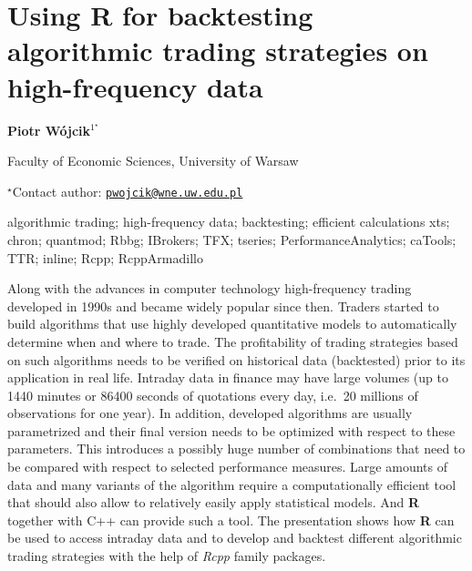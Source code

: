 \documentclass[\main/boa.tex]{subfiles}
\begin{document}
\pagestyle{empty}

\section{Using R for backtesting algorithmic trading strategies on high-frequency
data}

\begin{center}
  {\bf Piotr Wójcik$^{1^\star}$}
\end{center}

\vskip 0.3cm

\begin{affiliations}
\begin{enumerate}
\begin{minipage}{0.915\textwidth}
\centering
\item Faculty of Economic Sciences, University of Warsaw \\[-2pt]
\end{minipage}
\end{enumerate}
$^\star$Contact author: \href{mailto:pwojcik@wne.uw.edu.pl}{\nolinkurl{pwojcik@wne.uw.edu.pl}}\\
\end{affiliations}

\vskip 0.5cm

\begin{minipage}{0.915\textwidth}
\keywords algorithmic trading; high-frequency data; backtesting; efficient
calculations
\packages xts; chron; quantmod; Rbbg; IBrokers; TFX; tseries;
PerformanceAnalytics; caTools; TTR; inline; Rcpp; RcppArmadillo
\end{minipage}

\vskip 0.8cm

Along with the advances in computer technology high-frequency trading
developed in 1990s and became widely popular since then. Traders started
to build algorithms that use highly developed quantitative models to
automatically determine when and where to trade. The profitability of
trading strategies based on such algorithms needs to be verified on
historical data (backtested) prior to its application in real life.
Intraday data in finance may have large volumes (up to 1440 minutes or
86400 seconds of quotations every day, i.e.~20 millions of observations
for one year). In addition, developed algorithms are usually
parametrized and their final version needs to be optimized with respect
to these parameters. This introduces a possibly huge number of
combinations that need to be compared with respect to selected
performance measures. Large amounts of data and many variants of the
algorithm require a computationally efficient tool that should also
allow to relatively easily apply statistical models. And \textbf{R}
together with C++ can provide such a tool. The presentation shows how
\textbf{R} can be used to access intraday data and to develop and
backtest different algorithmic trading strategies with the help of
\emph{Rcpp} family packages.
\end{document}
